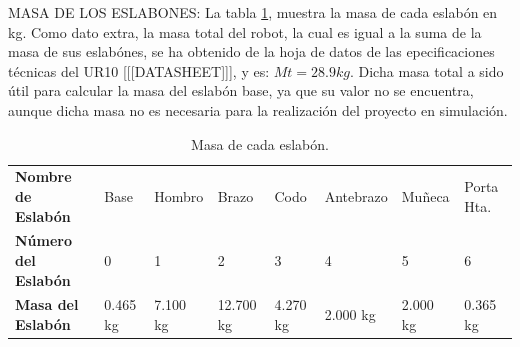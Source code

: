 \documentclass{article}
\begin{document}
MASA DE LOS ESLABONES:
La tabla \ref{table:Masa de cada eslabón}, muestra la masa de cada eslabón en kg.
Como dato extra, la masa total del robot, la cual es igual a la suma de la masa de sus eslabónes, se ha obtenido de la hoja de datos de las epecificaciones técnicas del UR10 [[[DATASHEET]]], y es: $Mt = 28.9 kg$. Dicha masa total a sido útil para calcular la masa del eslabón base, ya que su valor no se encuentra, aunque dicha masa no es necesaria para la realización del proyecto en simulación.
\begin{table}[]
\centering
\begin{tabular}{|l|lllllll|}
\cline{1-8}
\textbf{Nombre de Eslabón}  & Base     & Hombro   & Brazo     & Codo     & Antebrazo & Muñeca   & Porta Hta. \\ \cline{1-8}
\textbf{Número del Eslabón} & 0        & 1        & 2         & 3        & 4         & 5        & 6                 \\ \cline{1-8}
\textbf{Masa del Eslabón}   & 0.465 kg & 7.100 kg & 12.700 kg & 4.270 kg & 2.000 kg  & 2.000 kg & 0.365 kg          \\ \cline{1-8}
\end{tabular}
\caption{\label{table:Masa de cada eslabón}Masa de cada eslabón.}
\end{table}
\end{document}
